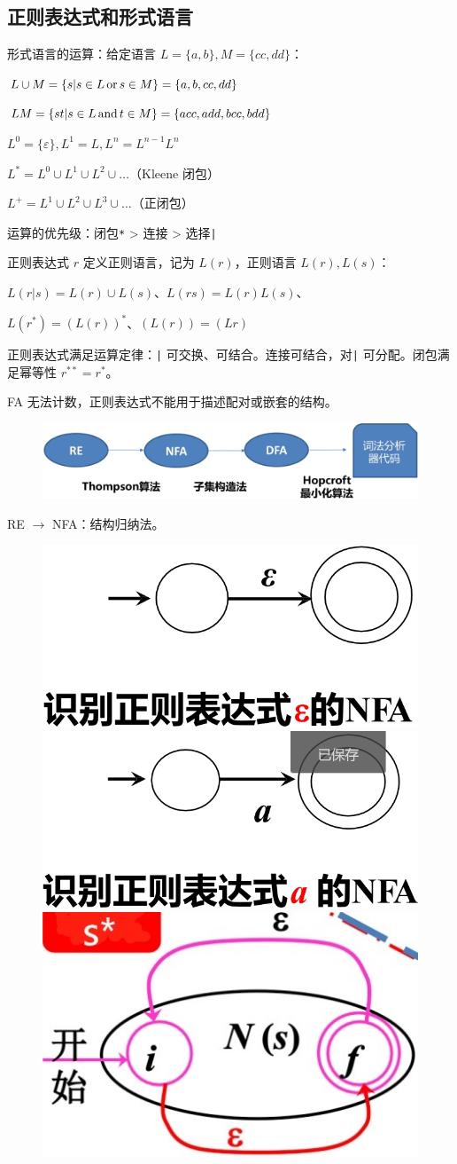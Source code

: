 \subsection*{正则表达式和形式语言}
\par \noindent 形式语言的运算：给定语言 $L=\{a, b\}, M = \{cc, dd\}$：
\par \noindent $L \cup M = \{s | s\in L \,\text{or}\, s \in M\} =  \{a, b, cc, dd\}$
\par \noindent $LM = \{st | s\in L \,\text{and}\, t \in M\} = \{acc, add, bcc, bdd\}$
\par \noindent $L^0 = \{\varepsilon\},L^1 = L, L^n = L^{n-1}L^n$
\par \noindent $L^* = L^0 \cup L^1 \cup L^2 \cup \dots$（Kleene 闭包）
\par \noindent $L^+ = L^1 \cup L^2 \cup L^3 \cup \dots$（正闭包）
\par \noindent 运算的优先级：闭包\texttt{*} > 连接 > 选择\texttt{|}
\par \noindent 正则表达式 $r$ 定义正则语言，记为 $L(r)$，正则语言 $L(r), L(s)$：
\par \noindent $L(r|s) = L(r) \cup L(s)$、$L(rs) = L(r)L(s)$、
\par \noindent $L(r^*) = (L(r))^*$、$(L(r)) = (Lr)$
\par \noindent 正则表达式满足运算定律：\texttt{|} 可交换、可结合。连接可结合，对\texttt{|} 可分配。闭包满足幂等性 $r^{**} = r^*$。
\par \noindent FA 无法计数，正则表达式不能用于描述配对或嵌套的结构。
\begin{figure}[H]
    \centering
    \includegraphics[width=0.8\linewidth]{figures/lex1.png}
\end{figure}
\par \noindent RE $\rightarrow$ NFA：结构归纳法。
\begin{figure}[H]
    \centering
    \includegraphics[width=0.3\linewidth]{figures/lex2.png}
    \includegraphics[width=0.3\linewidth]{figures/lex3.png}
    \includegraphics[width=0.2\linewidth]{figures/lex6.png}
\end{figure}
